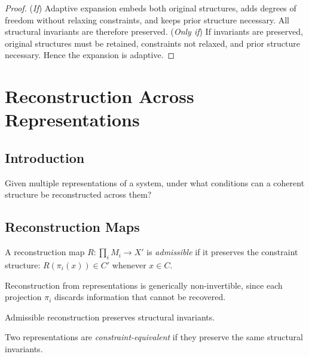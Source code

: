 \documentclass[11pt,openany]{book}
\begin{document}
\begin{proof}
(\emph{If}) Adaptive expansion embeds both original
structures, adds degrees of freedom without relaxing
constraints, and keeps prior structure necessary. All
structural invariants are therefore preserved. (\emph{Only
if}) If invariants are preserved, original structures must
be retained, constraints not relaxed, and prior structure
necessary. Hence the expansion is adaptive.
\end{proof}


\chapter{Reconstruction Across Representations}
\label{ch:reconstruction}

\section{Introduction}
\label{sec:introduction-reconstruction}

Given multiple representations of a system, under what
conditions can a coherent structure be reconstructed across
them?

\section{Reconstruction Maps}
\label{sec:reconstruction-maps}

\begin{definition}
\label{def:admissible-reconstruction}
A reconstruction map $R : \prod_{i} M_i \to X'$ is
\emph{admissible} if it preserves the constraint structure:
$R(\pi_i(x)) \in C'$ whenever $x \in C$.
\end{definition}

\begin{proposition}
\label{prop:noninvertibility-reconstruction}
Reconstruction from representations is generically
non-invertible, since each projection $\pi_i$ discards
information that cannot be recovered.
\end{proposition}

\begin{proposition}
\label{prop:invariant-preservation}
Admissible reconstruction preserves structural invariants.
\end{proposition}

\begin{definition}
\label{def:equivalence}
Two representations are \emph{constraint-equivalent} if
they preserve the same structural invariants.
\end{definition}
\end{document}
